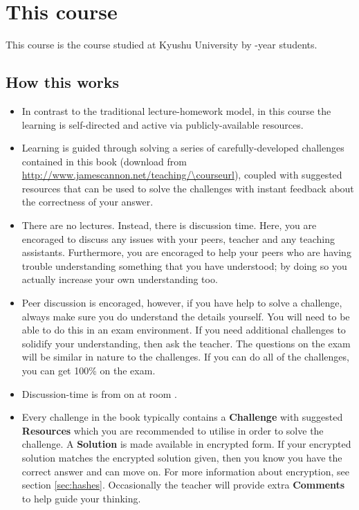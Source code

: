 \section{This course}
This course is the \course course studied at Kyushu University by \nensei-year students.

\subsection{How this works}
\begin{itemize}
    \item In contrast to the traditional lecture-homework model, in this course the learning is self-directed and active via publicly-available resources.
    \item Learning is guided through solving a series of carefully-developed challenges contained in this book (download from \url{http://www.jamescannon.net/teaching/\courseurl}), coupled with suggested resources that can be used to solve the challenges with instant feedback about the correctness of your answer.
    \item There are no lectures. Instead, there is discussion time. Here, you are encoraged to discuss any issues with your peers, teacher and any teaching assistants. Furthermore, you are encoraged to help your peers who are having trouble understanding something that you have understood; by doing so you actually increase your own understanding too.
    \item Peer discussion is encoraged, however, if you have help to solve a challenge, always make sure you do understand the details yourself. You will need to be able to do this in an exam environment. If you need additional challenges to solidify your understanding, then ask the teacher. The questions on the exam will be similar in nature to the challenges. If you can do all of the challenges, you can get 100\% on the exam.
    \item Discussion-time is from \disctime on \discdays at room \discroom.
    \item Every challenge in the book typically contains a \textbf{Challenge} with suggested \textbf{Resources} which you are recommended to utilise in order to solve the challenge. A \textbf{Solution} is made available in encrypted form. If your encrypted solution matches the encrypted solution given, then you know you have the correct answer and can move on. For more information about encryption, see section \ref{sec:hashes}. Occasionally the teacher will provide extra \textbf{Comments} to help guide your thinking.

\end{itemize}

